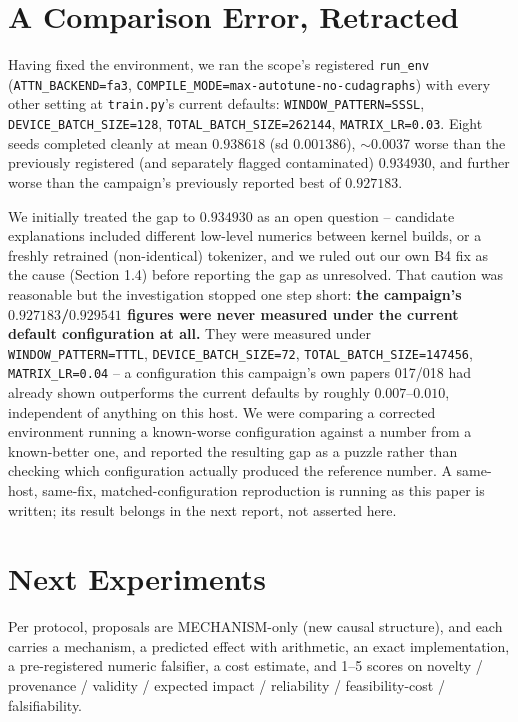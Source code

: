 \documentclass{article}
\begin{document}
\section{A Comparison Error, Retracted}
Having fixed the environment, we ran the scope's registered \texttt{run\_env} (\texttt{ATTN\_BACKEND=fa3}, \texttt{COMPILE\_MODE=max-autotune-no-cudagraphs}) with every other setting at \texttt{train.py}'s current defaults: \texttt{WINDOW\_PATTERN=SSSL}, \texttt{DEVICE\_BATCH\_SIZE=128}, \texttt{TOTAL\_BATCH\_SIZE=262144}, \texttt{MATRIX\_LR=0.03}. Eight seeds completed cleanly at mean $0.938618$ (sd $0.001386$), $\sim$0.0037 worse than the previously registered (and separately flagged contaminated) $0.934930$, and further worse than the campaign's previously reported best of $0.927183$.

We initially treated the gap to $0.934930$ as an open question -- candidate explanations included different low-level numerics between kernel builds, or a freshly retrained (non-identical) tokenizer, and we ruled out our own B4 fix as the cause (Section 1.4) before reporting the gap as unresolved. That caution was reasonable but the investigation stopped one step short: \textbf{the campaign's $0.927183$/$0.929541$ figures were never measured under the current default configuration at all.} They were measured under \texttt{WINDOW\_PATTERN=TTTL}, \texttt{DEVICE\_BATCH\_SIZE=72}, \texttt{TOTAL\_BATCH\_SIZE=147456}, \texttt{MATRIX\_LR=0.04} -- a configuration this campaign's own papers 017/018 had already shown outperforms the current defaults by roughly $0.007$--$0.010$, independent of anything on this host. We were comparing a corrected environment running a known-worse configuration against a number from a known-better one, and reported the resulting gap as a puzzle rather than checking which configuration actually produced the reference number. A same-host, same-fix, matched-configuration reproduction is running as this paper is written; its result belongs in the next report, not asserted here.

\section{Next Experiments}
\label{sec:next}
Per protocol, proposals are MECHANISM-only (new causal structure), and each carries a mechanism, a predicted effect with arithmetic, an exact implementation, a pre-registered numeric falsifier, a cost estimate, and 1--5 scores on novelty / provenance / validity / expected impact / reliability / feasibility-cost / falsifiability.
\end{document}
